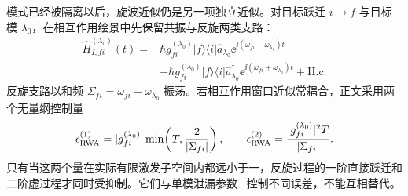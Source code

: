 模式已经被隔离以后，旋波近似仍是另一项独立近似。对目标跃迁 $i\to f$ 与目标模 $\lambda_0$，在相互作用绘景中先保留共振与反旋两类支路：
\begin{equation}
{
\begin{aligned}
\hat H_{I,fi}^{(\lambda_0)}(t)
={}&\hbar g_{fi}^{(\lambda_0)}|f\rangle\langle i|\hat a_{\lambda_0}
\ee^{\ii(\omega_{fi}-\omega_{\lambda_0})t}\\
&+\hbar g_{fi}^{(\lambda_0)}|f\rangle\langle i|\hat a_{\lambda_0}^\dagger
\ee^{\ii(\omega_{fi}+\omega_{\lambda_0})t}
+\mathrm{H.c.}
\end{aligned}}
\label{eq:single_mode_full_four_branch_interaction}
\end{equation}
反旋支路以和频 $\Sigma_{fi}=\omega_{fi}+\omega_{\lambda_0}$ 振荡。若相互作用窗口近似常耦合，正文采用两个无量纲控制量
\begin{equation}
 {
 \epsilon_{\rm RWA}^{(1)}
 =|g_{fi}^{(\lambda_0)}|
 \min\!\left(T,\frac{2}{|\Sigma_{fi}|}\right),
 \qquad
 \epsilon_{\rm RWA}^{(2)}
 =\frac{|g_{fi}^{(\lambda_0)}|^2T}{|\Sigma_{fi}|}.}
 \label{eq:rwa-finite-time-error-scales-dp68}
\end{equation}
只有当这两个量在实际有限激发子空间内都远小于一，反旋过程的一阶直接跃迁和二阶虚过程才同时受抑制。它们与单模泄漏参数~ 控制不同误差，不能互相替代。

